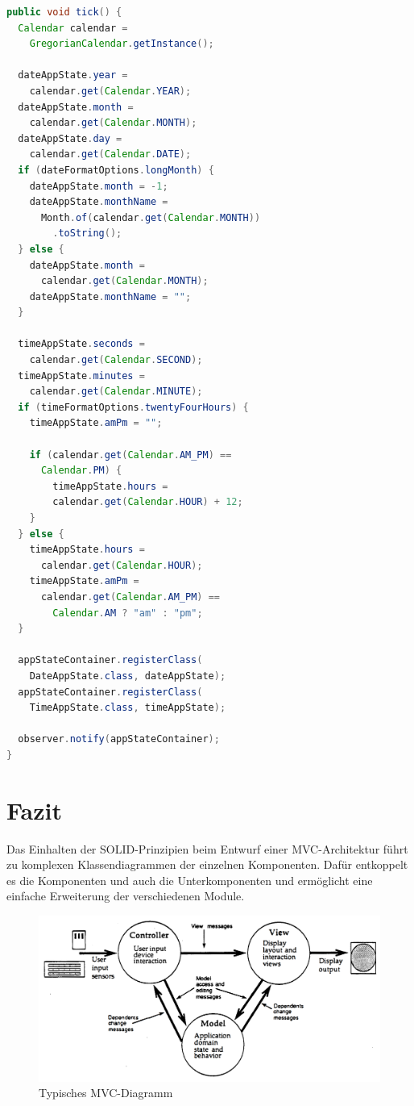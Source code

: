 \documentclass{vldb}
\begin{document}
\begin{small}
\begin{lstlisting}[language=Java, caption=Das Model der Anwendung, label=list:contractcontroller]
public void tick() {
  Calendar calendar =
    GregorianCalendar.getInstance();

  dateAppState.year =
    calendar.get(Calendar.YEAR);
  dateAppState.month =
    calendar.get(Calendar.MONTH);
  dateAppState.day =
    calendar.get(Calendar.DATE);
  if (dateFormatOptions.longMonth) {
    dateAppState.month = -1;
    dateAppState.monthName =
      Month.of(calendar.get(Calendar.MONTH))
        .toString();
  } else {
    dateAppState.month =
      calendar.get(Calendar.MONTH);
    dateAppState.monthName = "";
  }

  timeAppState.seconds =
    calendar.get(Calendar.SECOND);
  timeAppState.minutes =
    calendar.get(Calendar.MINUTE);
  if (timeFormatOptions.twentyFourHours) {
    timeAppState.amPm = "";

    if (calendar.get(Calendar.AM_PM) ==
      Calendar.PM) {
        timeAppState.hours =
        calendar.get(Calendar.HOUR) + 12;
    }
  } else {
    timeAppState.hours =
      calendar.get(Calendar.HOUR);
    timeAppState.amPm =
      calendar.get(Calendar.AM_PM) ==
        Calendar.AM ? "am" : "pm";
  }

  appStateContainer.registerClass(
    DateAppState.class, dateAppState);
  appStateContainer.registerClass(
    TimeAppState.class, timeAppState);

  observer.notify(appStateContainer);
}

\end{lstlisting}
\end{small}

\section{Fazit}
Das Einhalten der SOLID-Prinzipien beim Entwurf einer MVC-Architektur führt zu komplexen Klassendiagrammen der einzelnen Komponenten. Dafür entkoppelt es die Komponenten und auch die Unterkomponenten und ermöglicht eine einfache Erweiterung der verschiedenen Module.

\begin{figure}[h]
  \centering
  \includegraphics[scale=.15,natwidth=1350,natheight=700]{diagram.png}
  \caption[caption]{Typisches MVC-Diagramm \cite[S.~27]{KraPo88}}
  \label{diagram}
\end{figure}
\end{document}

